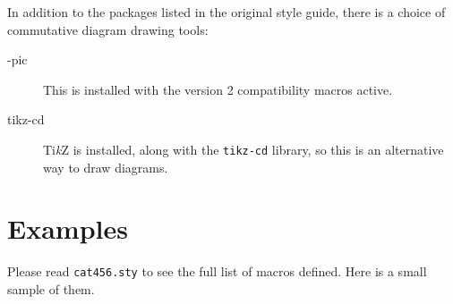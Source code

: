 \documentclass{article}
\begin{document}
In addition to the packages listed in the original style guide, there
is a choice of commutative diagram drawing tools:

\begin{description}
\item[\Xy-pic] This is installed with the version 2 compatibility
  macros active.
\item[tikz-cd] Ti\emph{k}Z is installed, along with the \verb+tikz-cd+
  library, so this is an alternative way to draw diagrams.
\end{description}

\section*{Examples}

Please read \verb+cat456.sty+ to see the full list of macros defined.
Here is a small sample of them.
\end{document}
